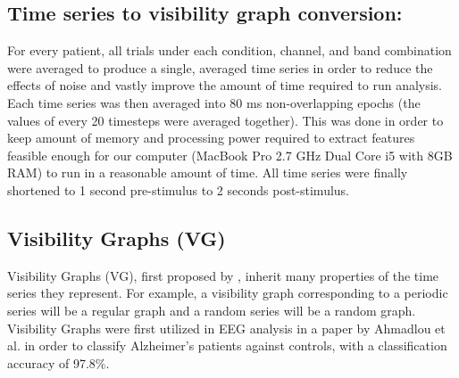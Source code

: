 \documentclass[Afour,times,sageh]{sagej}
\begin{document}
\subsection{Time series to visibility graph conversion:}
For every patient, all trials under each condition, channel, and band combination were averaged to produce a single, averaged time series in order to reduce the effects of noise and vastly improve the amount of time required to run analysis. Each time series was then averaged into 80 ms non-overlapping epochs (the values of every 20 timesteps were averaged together). This was done in order to keep amount of memory and processing power required to extract features feasible enough for our computer (MacBook Pro 2.7 GHz Dual Core i5 with 8GB RAM) to run in a reasonable amount of time. All time series were finally shortened to 1 second pre-stimulus to 2 seconds post-stimulus.
\subsection{Visibility Graphs (VG)}
Visibility Graphs (VG), first proposed by \citet{Lacasa2008}, inherit many properties of the time series they represent. For example, a visibility graph corresponding to a periodic series will be a regular graph and a random series will be a random graph. Visibility Graphs were first utilized in EEG analysis in a paper by Ahmadlou et al. \citep{Ahmadlou2010} in order to classify Alzheimer’s patients against controls, with a classification accuracy of 97.8\%.
\end{document}
